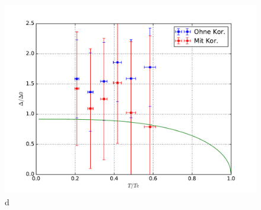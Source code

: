\documentclass[twoside,        %
               BCOR12mm,       %
               english,ngerman, %
               fleqn,headsepline=false,footsepline=false
              ]{MFPREPORT}
\begin{document}
\begin{figure}[h]
\includegraphics[scale=0.5]{4.pdf}
\caption{d}
\label{fig:NLNL}
\end{figure}

%
%
%
%



\end{document}
